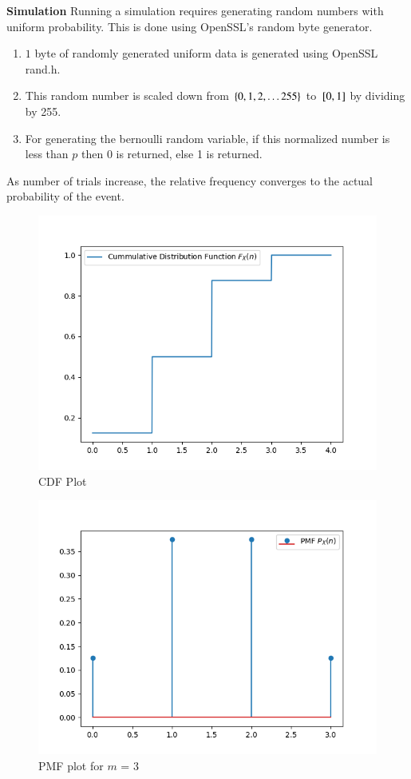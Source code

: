 \documentclass[journal]{IEEEtran}
\begin{document}
\textbf{Simulation}
Running a simulation requires generating random numbers with uniform probability. This is done using OpenSSL's random byte generator.
\begin{enumerate}
    \item $1$ byte of randomly generated uniform data is generated using OpenSSL rand.h.
    \item This random number is scaled down from $\left\{0, 1, 2, \dots 255\right\}$ to ${}\left[0, 1\right]$ by dividing by 255.
    \item For generating the bernoulli random variable, if this normalized number is less than $p$ then 0 is returned, else 1 is returned.
\end{enumerate}
As number of trials increase, the relative frequency converges to the actual probability of the event.

\begin{figure}[h!]
  \centering
  \includegraphics[width=0.7\columnwidth]{figs/cdf.png}
  \caption{CDF Plot}
  \label{label}
\end{figure}

\begin{figure}[h!]
  \centering
  \includegraphics[width=0.7\columnwidth]{figs/pmf1.png}
  \caption{PMF plot for $m$ = 3}
  \label{label}
\end{figure}
\end{document}
